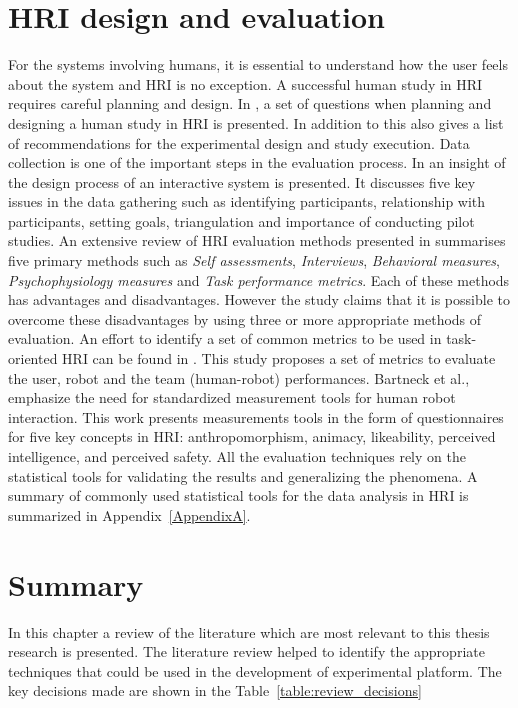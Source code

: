 \section{HRI design and evaluation} %
For the systems involving humans, it is essential to understand how the user feels about the system and HRI is no exception. A successful human study in HRI requires careful planning and design. In \cite{bethel2010review}, a set of questions when planning and designing a human study in HRI is presented. In addition to this \cite{bethel2010review} also gives a list of recommendations for the experimental design and study execution. Data collection is one of the important steps in the evaluation process. In \cite{Rogers2011} an insight of the design process of an interactive system is presented. It discusses five key issues in the data gathering such as identifying participants, relationship with participants, setting goals, triangulation and importance of conducting pilot studies. An extensive review of HRI evaluation methods presented in \cite{bethel2010review} summarises five primary methods such as \emph{Self assessments}, \emph{Interviews}, \emph{Behavioral measures}, \emph{Psychophysiology measures} and \emph{Task performance metrics}. Each of these methods has advantages and disadvantages. However the study claims that it is possible to overcome these disadvantages by using three or more appropriate methods of evaluation. An effort to identify a set of common metrics to be used in task-oriented HRI can be found in \cite{Steinfeld2006}. This study proposes a set of metrics to evaluate the user, robot and the team (human-robot) performances. Bartneck et al., \cite{bartneck2009measurement} emphasize the need for standardized measurement tools for human robot interaction. This work presents measurements tools in the form of questionnaires for five key concepts in HRI: anthropomorphism, animacy, likeability, perceived intelligence, and perceived safety. All the evaluation techniques rely on the statistical tools for validating the results and generalizing the phenomena. A summary of commonly used statistical tools for the data analysis in HRI is summarized in Appendix~\ref{AppendixA}.

\section{Summary}
In this chapter a review of the literature which are most relevant to this thesis research is presented. The literature review helped to identify the appropriate techniques that could be used in the development of experimental platform. The key decisions made are shown in the Table~\ref{table:review_decisions}

